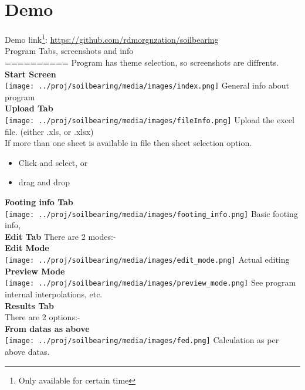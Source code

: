 \chapter{Demo}
Demo link\footnote{Only available for certain time}: \url{https://github.com/rdmorgnzation/soilbearing}\\

Program Tabs, screenshots and info\\
==========
Program has theme selection, so screenshots are diffrents.\\
\textbf{Start Screen}\\
\texttt{[image: ../proj/soilbearing/media/images/index.png]}
General info about program\\

\textbf{Upload Tab}\\
\texttt{[image: ../proj/soilbearing/media/images/fileInfo.png]}
Upload the excel file. (either .xls, or .xlsx)\\
If more than one sheet is available in file then sheet selection option.\\
\begin{itemize}
\item Click and select, or\\
\item drag and drop\\
\end{itemize}

\textbf{Footing info Tab}\\
\texttt{[image: ../proj/soilbearing/media/images/footing\_info.png]}
Basic footing info,\\

\textbf{Edit Tab}
There are 2 modes:-\\
\textbf{Edit Mode}\\
\texttt{[image: ../proj/soilbearing/media/images/edit\_mode.png]}
Actual editing\\

\textbf{Preview Mode}\\
\texttt{[image: ../proj/soilbearing/media/images/preview\_mode.png]}
See program internal interpolations, etc. \\

\textbf{Results Tab}\\
There are 2 options:-\\
\textbf{From datas as above}\\
\texttt{[image: ../proj/soilbearing/media/images/fed.png]}
Calculation as per above datas.\\

